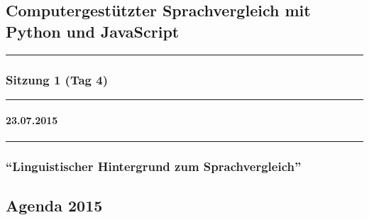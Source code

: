 
\subsection{Computergestützter Sprachvergleich mit Python und
JavaScript}

\begin{center}\rule{0.5\linewidth}{\linethickness}\end{center}

\subsubsection{Sitzung 1 (Tag 4)}

\begin{center}\rule{0.5\linewidth}{\linethickness}\end{center}

\paragraph{23.07.2015}

\begin{center}\rule{0.5\linewidth}{\linethickness}\end{center}

\subsubsection{\texorpdfstring{``Linguistischer Hintergrund zum
Sprachvergleich''}{Linguistischer Hintergrund zum Sprachvergleich}}

\subsection{\texorpdfstring{{Agenda 2015}}{Agenda 2015}}

